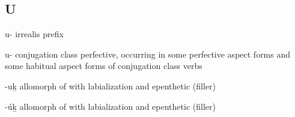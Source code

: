 \subsection{U}\label{sec:alphalist-u}
\begin{morphdesc}[resume*=alphalist]
\item[u-]\label{m:u-irr}
	irrealis prefix

\item[u-]\label{m:u-pfv}
	 conjugation class perfective,
	occurring in some perfective aspect forms and some habitual aspect forms of
	 conjugation class verbs

\item[-uḵ]\label{m:-uḵ}
	allomorph of  with labialization and epenthetic (filler) 

\item[-úḵ]\label{m:-úḵ}
	allomorph of  with labialization and epenthetic (filler) 

\end{morphdesc}

